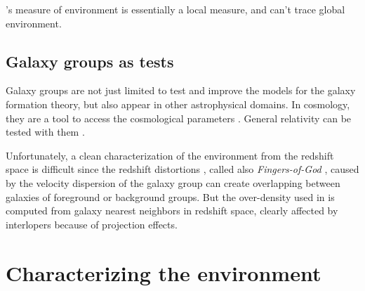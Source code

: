 \cite{Peng+10}'s measure of environment is essentially a local measure, and
can't trace global environment.
%

\subsection{Galaxy groups as tests}
\label{sub:galaxy_groups_as_tests}

Galaxy groups are not just limited to test and improve the models for the
galaxy formation theory, but also appear in other astrophysical domains. In
cosmology, they are a tool to access the cosmological parameters
\citep{Wang+98}. General relativity can be tested with them \citep{Wojtak+11}.

Unfortunately, a clean characterization of the environment from the redshift
space is difficult since the redshift distortions \citep{Jackson+72}, called
also \emph{Fingers-of-God} \citep{Tully+78}, caused by the velocity dispersion
of the galaxy group can create overlapping between galaxies of foreground or
background groups. But the over-density used in \citet{Peng+10} is computed
from galaxy nearest neighbors in redshift space, clearly affected by
interlopers because of projection effects.

\section{Characterizing the environment}
\label{sec:characterizing_environment}

